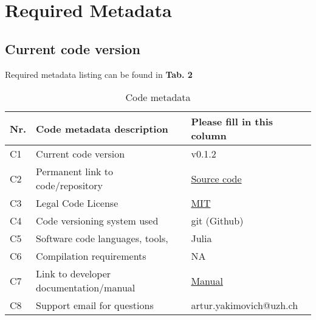 \section{Required Metadata}

\subsection{Current code version}

Required metadata listing can be found in \textbf{Tab. 2}

\begin{table}
\begin{tabular}{lll}
\hline
\textbf{Nr.} & \textbf{Code metadata description} & \textbf{Please fill in this column} \\
\hline
C1 & Current code version & v0.1.2 \\
\hline
C2 & Permanent link to code/repository & \href{https://github.com/MatlabCompat/MatlabCompat.jl}{Source code} \\
\hline
C3 & Legal Code License   & \href{http://opensource.org/licenses/MIT}{MIT} \\
\hline
C4 & Code versioning system used & git (Github) \\
\hline
C5 & Software code languages, tools, & Julia \\
\hline
C6 & Compilation requirements & NA \\
\hline
C7 & Link to developer documentation/manual & \href{http://matlabcompat.github.io/help.html}{Manual}\\
\hline
C8 & Support email for questions & artur.yakimovich@uzh.ch\\
\hline
\end{tabular}
\caption{Code metadata}
\end{table}